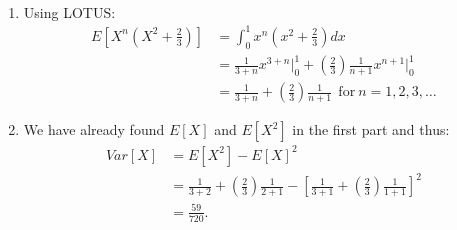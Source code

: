 \begin{problem}{3}  $ $
\begin{enumerate}

\item
Using LOTUS:
\begin{align*}
E\left[X^n\left(X^2+\frac{2}{3}\right)\right] &= \int_0^1 x^n\left(x^2+\frac{2}{3}\right)dx \\
& = \frac{1}{3+n}x^{3+n} \Big|_0^1 +\left(\frac{2}{3}\right)\frac{1}{n+1}x^{n+1} \Big|_0^1 \\
& = \frac{1}{3+n}+\left(\frac{2}{3}\right)\frac{1}{n+1}~~\mathrm{for}~n=1, 2, 3, \ldots
\end{align*}

\item
We have already found $E[X]$ and $E[X^2]$ in the first part and thus:
\begin{align*}
Var[X] & = E[X^2]- E[X]^2 \\
& = \frac{1}{3+2}+\left(\frac{2}{3} \right)\frac{1}{2+1}- \left [ \frac{1}{3+1}+\left(\frac{2}{3} \right)\frac{1}{1+1} \right]^2 \\
& = \frac{59}{720}.
\end{align*}
\end{enumerate}
\end{problem}


